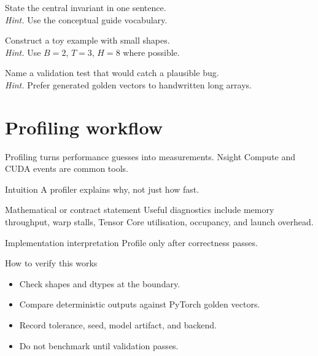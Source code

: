 \begin{chapterexercises}
\item State the central invariant in one sentence.\\
\textit{Hint.} Use the conceptual guide vocabulary.
\item Construct a toy example with small shapes.\\
\textit{Hint.} Use $B=2$, $T=3$, $H=8$ where possible.
\item Name a validation test that would catch a plausible bug.\\
\textit{Hint.} Prefer generated golden vectors to handwritten long arrays.
\end{chapterexercises}

\chapter{Profiling workflow}
\label{ch:profiling}
Profiling turns performance guesses into measurements. Nsight Compute and CUDA events are common tools. \citep{nsightCompute,cudaProgrammingGuide}



\begin{intuitionbox}{Intuition}
A profiler explains why, not just how fast.
\end{intuitionbox}

\begin{definitionbox}{Mathematical or contract statement}
Useful diagnostics include memory throughput, warp stalls, Tensor Core utilisation, occupancy, and launch overhead.
\end{definitionbox}

\begin{implementationbox}{Implementation interpretation}
Profile only after correctness passes.
\end{implementationbox}

\begin{verificationbox}{How to verify this works}
\begin{itemize}
\item Check shapes and dtypes at the boundary.
\item Compare deterministic outputs against PyTorch golden vectors.
\item Record tolerance, seed, model artifact, and backend.
\item Do not benchmark until validation passes.
\end{itemize}
\end{verificationbox}

